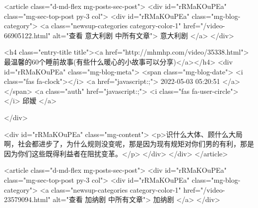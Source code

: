                                     <article class="d-md-flex mg-posts-sec-post">
                                        <div id="rRMaKOuPEa"  class="mg-sec-top-post py-3 col">
                                            <div id="rRMaKOuPEa"  class="mg-blog-category">
                                                <a class="newsup-categories category-color-1" href="/video-66905122.html" alt="查看 意大利剧 中所有文章">
                                                    意大利剧
                                                </a>
                                            </div>

                                            <h4 class="entry-title title"><a href="http://mhmhp.com/video/35338.html">最温馨的60个睡前故事(有些什么暖心的小故事可以分享)</a></h4>
                                            <div id="rRMaKOuPEa"  class="mg-blog-meta">
                                                <span class="mg-blog-date">
                                                    <i class="fas fa-clock"></i>
                                                    <a href="javascript:;">
                                                        2022-05-03 05:20:51
                                                    </a>
                                                </span>
                                                <a class="auth" href="javascript:;">
                                                    <i class="fas fa-user-circle"></i>
                                                    邱嫒
                                                </a>

                                            </div>


                                            <div id="rRMaKOuPEa"  class="mg-content">
                                                <p>识什么大体、顾什么大局啊，社会都进步了，为什么规则没变呢，那是因为现有规矩对你们男的有利，那是因为你们这些既得利益者在阻扰变革。</p>
                                            </div>
                                        </div>
                                    </article>
                                    
                                    <article class="d-md-flex mg-posts-sec-post">
                                        <div id="rRMaKOuPEa"  class="mg-sec-top-post py-3 col">
                                            <div id="rRMaKOuPEa"  class="mg-blog-category">
                                                <a class="newsup-categories category-color-1" href="/video-23579094.html" alt="查看 加纳剧 中所有文章">
                                                    加纳剧
                                                </a>
                                            </div>

